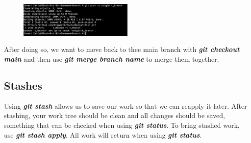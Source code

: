 \documentclass{article}
\begin{document}
\begin{figure}[h]
    \centering
    \includegraphics[width=0.5\textwidth]{push.png}
\end{figure}

After doing so, we want to move back to thee main branch with \textit{\textbf{git checkout main}} and then use \textit{\textbf{git merge branch name}} to merge them together.

\subsection*{Stashes}

Using \textit{\textbf{git stash}} allows us to save our work so that we can reapply it later. After stashing, your work tree should be clean and all changes should be saved, something that can be checked when using \textit{\textbf{git status}}. To bring stashed work, use \textit{\textbf{git stash apply}}. All work will return when using \textit{\textbf{git status}}.
\end{document}
